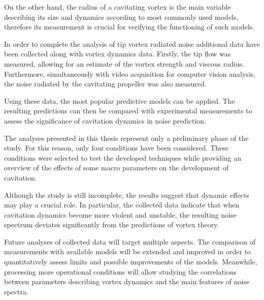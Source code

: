 On the other hand, the radius of a cavitating vortex is the main variable describing its size and dynamics according to most commonly used models, therefore its measurement is crucial for verifying the functioning of such models. 

In order to complete the analysis of tip vortex radiated noise additional data have been collected along with vortex dynamics data.
Firstly, the tip flow was measured, allowing for an estimate of the vortex strength and viscous radius. Furthermore, simultaneously with video acquisition for computer vision analysis, the noise radiated by the cavitating propeller was also measured.

Using these data, the most popular predictive models can be applied. The resulting predictions can then be compared with experimental measurements to assess the significance of cavitation dynamics in noise prediction.

The analyses presented in this thesis represent only a preliminary phase of the study. For this reason, only four conditions have been considered. These conditions were selected to test the developed techniques while providing an overview of the effects of some macro parameters on the development of cavitation.

Although the study is still incomplete, the results suggest that dynamic effects may play a crucial role. In particular, the collected data indicate that when cavitation dynamics become more violent and unstable, the resulting noise spectrum deviates significantly from the predictions of vortex theory.

Future analyses of collected data will target multiple aspects. The comparison of measurements with available models will be extended and improved in order to quantitatively assess limits and possible improvements of the models. Meanwhile, processing more operational conditions will allow studying the correlations between parameters describing vortex dynamics and the main features of noise spectra.
